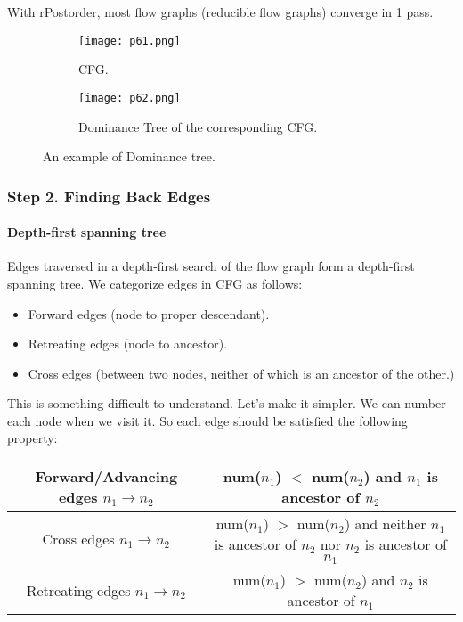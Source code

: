 With rPostorder, most flow graphs (reducible flow graphs) converge in 1 pass. 


\begin{figure}[H]
    \centering
    \begin{subfigure}{0.3\textwidth}
    \centering
        \texttt{[image: p61.png]}
        \caption{CFG.}
        \label{fig:p61}
    \end{subfigure}
    \begin{subfigure}{0.3\textwidth}
    \centering
        \texttt{[image: p62.png]}
        \caption{Dominance Tree of the corresponding CFG.}
        \label{fig:p62}
    \end{subfigure}
    
    \caption{An example of Dominance tree.}
       \label{fig:p51-58}
\end{figure}



\subsubsection{Step 2. Finding Back Edges}

\paragraph{Depth-first spanning tree}
Edges traversed in a depth-first search of the flow graph form a depth-first spanning tree. We categorize edges in CFG as follows:
\begin{itemize}
    \item Forward edges (node to proper descendant).
    \item Retreating edges (node to ancestor).
    \item Cross edges (between two nodes, neither of which is an ancestor of the other.)
\end{itemize}

This is something difficult to understand. Let's make it simpler. We can number each node when we visit it. So each edge should be satisfied the following property:


\begin{center}
\begin{tabular}{|c|c|}
\hline Forward/Advancing edges  \( n_1 \rightarrow n_2\) & num($n_1$) $<$ num($n_2$) and  $n_1$ is ancestor of  $n_2$\\
\hline Cross edges  \( n_1 \rightarrow n_2\)& num($n_1$) $>$ num($n_2$) and neither  $n_1$ is ancestor of  $n_2$ nor $n_2$ is ancestor of  $n_1$ \\
\hline Retreating edges  \( n_1 \rightarrow n_2\) & num($n_1$) $>$ num($n_2$) and  $n_2$ is ancestor of  $n_1$\\
\hline
\end{tabular}  
\end{center}





